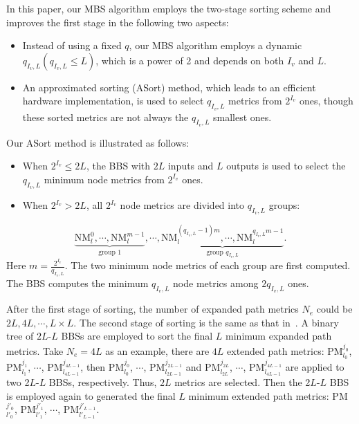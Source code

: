 \documentclass[journal]{IEEEtran}
\begin{document}
In this paper, our MBS algorithm employs the two-stage sorting scheme and improves the first stage in the following two aspects:
\begin{itemize}
\item Instead of using a fixed $q$, our MBS algorithm employs a dynamic $q_{I_v,L} (q_{I_v,L}\leqslant L)$, which is a power of 2 and depends on both $I_v$ and $L$.
\item An approximated sorting (ASort) method, which leads to an efficient hardware implementation, is used to select $q_{I_v,L}$ metrics from $2^{I_v}$ ones, though these sorted metrics are not always the $q_{I_v,L}$ smallest ones.
\end{itemize}
Our ASort method is illustrated as follows:
\begin{itemize}
\item When $2^{I_v}\leqslant 2L$, the BBS with $2L$ inputs and $L$ outputs is used to select the $q_{I_v,L}$ minimum node metrics from $2^{I_v}$ ones.
\item When $2^{I_v} > 2L$, all $2^{I_v}$ node metrics are divided into $q_{I_v,L}$ groups:
\end{itemize}
\begin{equation}\nonumber
\underbrace{\mbox{NM}_l^0, \cdots, \mbox{NM}_l^{m-1}}_{\mbox{group 1}},\cdots,\underbrace{\mbox{NM}_l^{(q_{I_v,L}-1)m}, \cdots, \mbox{NM}_l^{q_{I_v,L}m-1}}_{\mbox{group } q_{I_v,L}}.
\end{equation}
Here $m= \frac{2^{I_v}}{q_{I_v,L}}$. The two minimum node metrics of each group are first computed. The BBS computes the minimum $q_{I_v,L}$ node metrics among $2q_{I_v,L}$ ones.

After the first stage of sorting, the number of expanded path metrics $N_e$ could be $2L, 4L,\cdots, L\times L$. The second stage of sorting is the same as that in~\cite{chenrong_tsp}. A binary tree of $2L$-$L$ BBSs are employed to sort the final $L$ minimum expanded path metrics. Take $N_e=4L$ as an example, there are $4L$ extended path metrics: PM$_{l_0}^{j_0}$, PM$_{l_1}^{j_1}$, $\cdots$, PM$_{l_{4L-1}}^{j_{4L-1}}$, then PM$_{l_0}^{j_0}$, $\cdots$, PM$_{l_{2L-1}}^{j_{2L-1}}$ and PM$_{l_{2L}}^{j_{2L}}$, $\cdots$, PM$_{l_{4L-1}}^{j_{4L-1}}$ are applied to two 2$L$-$L$ BBSs, respectively. Thus, $2L$ metrics are selected. Then the 2$L$-$L$ BBS is employed again to generated the final $L$ minimum extended path metrics: PM$_{l'_0}^{j'_0}$, PM$_{l'_1}^{j'_1}$, $\cdots$, PM$_{l'_{L-1}}^{j'_{L-1}}$.
\end{document}
